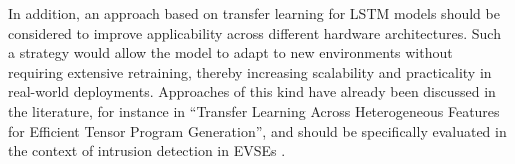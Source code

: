 In addition, an approach based on transfer learning for LSTM models should be considered to improve applicability across different hardware architectures. Such a strategy would allow the model to adapt to new environments without requiring extensive retraining, thereby increasing scalability and practicality in real-world deployments. Approaches of this kind have already been discussed in the literature, for instance in “Transfer Learning Across Heterogeneous Features for Efficient Tensor Program Generation”, and should be specifically evaluated in the context of intrusion detection in EVSEs \cite{transfer_learning}.\\
